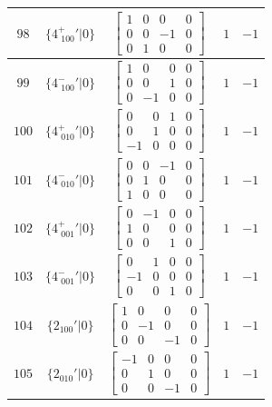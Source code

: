 \documentclass[fleqn,8pt]{jsarticle}
\begin{document}
\begin{longtable}{ccccc}
$ 98 $ & $ \{4^{+}_{\,\,100}{}'|0\} $ & $ \begin{bmatrix} 1 & 0 & 0 & 0 \\ 0 & 0 & -1 & 0 \\ 0 & 1 & 0 & 0 \end{bmatrix} $ & $ 1 $ & $ -1 $ \\ \hline
$ 99 $ & $ \{4^{-}_{\,\,100}{}'|0\} $ & $ \begin{bmatrix} 1 & 0 & 0 & 0 \\ 0 & 0 & 1 & 0 \\ 0 & -1 & 0 & 0 \end{bmatrix} $ & $ 1 $ & $ -1 $ \\ \hline
$ 100 $ & $ \{4^{+}_{\,\,010}{}'|0\} $ & $ \begin{bmatrix} 0 & 0 & 1 & 0 \\ 0 & 1 & 0 & 0 \\ -1 & 0 & 0 & 0 \end{bmatrix} $ & $ 1 $ & $ -1 $ \\ \hline
$ 101 $ & $ \{4^{-}_{\,\,010}{}'|0\} $ & $ \begin{bmatrix} 0 & 0 & -1 & 0 \\ 0 & 1 & 0 & 0 \\ 1 & 0 & 0 & 0 \end{bmatrix} $ & $ 1 $ & $ -1 $ \\ \hline
$ 102 $ & $ \{4^{+}_{\,\,001}{}'|0\} $ & $ \begin{bmatrix} 0 & -1 & 0 & 0 \\ 1 & 0 & 0 & 0 \\ 0 & 0 & 1 & 0 \end{bmatrix} $ & $ 1 $ & $ -1 $ \\ \hline
$ 103 $ & $ \{4^{-}_{\,\,001}{}'|0\} $ & $ \begin{bmatrix} 0 & 1 & 0 & 0 \\ -1 & 0 & 0 & 0 \\ 0 & 0 & 1 & 0 \end{bmatrix} $ & $ 1 $ & $ -1 $ \\ \hline
$ 104 $ & $ \{2{}_{100}{}'|0\} $ & $ \begin{bmatrix} 1 & 0 & 0 & 0 \\ 0 & -1 & 0 & 0 \\ 0 & 0 & -1 & 0 \end{bmatrix} $ & $ 1 $ & $ -1 $ \\ \hline
$ 105 $ & $ \{2{}_{010}{}'|0\} $ & $ \begin{bmatrix} -1 & 0 & 0 & 0 \\ 0 & 1 & 0 & 0 \\ 0 & 0 & -1 & 0 \end{bmatrix} $ & $ 1 $ & $ -1 $ \\ \hline

\end{longtable}
\end{document}
